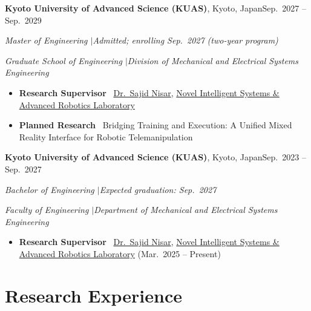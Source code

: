 \documentclass[11pt,a4paper]{article}
\let\cvorigsection\section
\renewcommand{\section}[1]{\Needspace{6\baselineskip}\cvorigsection{#1}}
\newcommand{\entry}[3]{\par\Needspace{4\baselineskip}\textbf{#1}#2\hfill #3\par\nopagebreak}
\newcommand{\sub}[1]{{\itshape #1}\par}
\newcommand{\lab}[1]{\textbf{#1}\ }
\begin{document}
\entry{Kyoto University of Advanced Science (KUAS)}{, Kyoto, Japan}{Sep.\ 2027 -- Sep.\ 2029}
\sub{Master of Engineering \quad$|$\quad Admitted; enrolling Sep.\ 2027 (two-year program)}
\sub{Graduate School of Engineering \quad$|$\quad Division of Mechanical and Electrical Systems Engineering}
\begin{itemize}
  \item \lab{Research Supervisor} \href{https://www.kuas.ac.jp/en/f-r/eng/sajid-nisar/}{Dr.\ Sajid Nisar},
        \href{https://nisarlab.org/}{Novel Intelligent Systems \& Advanced Robotics Laboratory}
  \item \lab{Planned Research} Bridging Training and Execution: A Unified Mixed Reality Interface for
        Robotic Telemanipulation
\end{itemize}

\vspace{3pt}
\entry{Kyoto University of Advanced Science (KUAS)}{, Kyoto, Japan}{Sep.\ 2023 -- Sep.\ 2027}
\sub{Bachelor of Engineering \quad$|$\quad Expected graduation: Sep.\ 2027}
\sub{Faculty of Engineering \quad$|$\quad Department of Mechanical and Electrical Systems Engineering}
\begin{itemize}
  \item \lab{Research Supervisor} \href{https://www.kuas.ac.jp/en/f-r/eng/sajid-nisar/}{Dr.\ Sajid Nisar},
        \href{https://nisarlab.org/}{Novel Intelligent Systems \& Advanced Robotics Laboratory}
        (Mar.\ 2025 -- Present)
\end{itemize}

\section{Research Experience}
\end{document}

